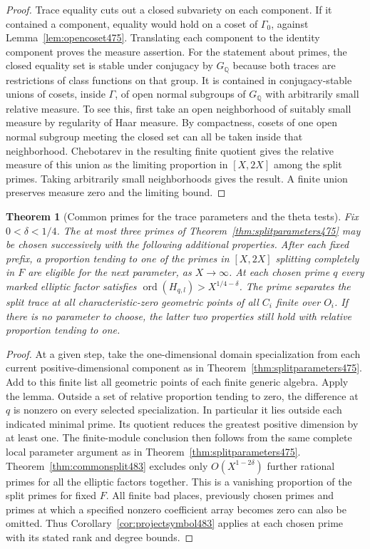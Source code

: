 \documentclass[a4paper,11pt]{article}
\newtheorem{theorem}[proposition]{Theorem}
\theoremstyle{definition}
\theoremstyle{remark}
\numberwithin{equation}{section}
\begin{document}
\begin{proof}
Trace equality cuts out a closed subvariety on each component.
If it contained a component, equality would hold on a coset
of \(\Gamma_0\), against Lemma~\ref{lem:opencoset475}. Translating
each component to the identity component proves the measure
assertion. For the statement about primes, the closed equality
set is stable under conjugacy by \(G_{\mathbb Q}\) because both
traces are restrictions of class functions on that group.
It is contained in conjugacy-stable unions of cosets, inside
\(\Gamma\), of open normal subgroups of \(G_{\mathbb Q}\) with
arbitrarily small relative measure. To see this, first take an
open neighborhood of suitably small measure by regularity of
Haar measure. By compactness, cosets of one open normal subgroup
meeting the closed set can all be taken inside that neighborhood.
Chebotarev in the resulting finite quotient gives the relative
measure of this union as the limiting proportion in \([X,2X]\)
among the split primes. Taking arbitrarily small neighborhoods
gives the result. A finite union preserves measure zero and the
limiting bound.
\end{proof}

\begin{theorem}[Common primes for the trace parameters and the theta tests]\leavevmode
\label{thm:jointprimes484}
Fix \(0<\delta<1/4\). The at most three primes of
Theorem~\ref{thm:splitparameters475} may be chosen successively
with the following additional properties. After each fixed
prefix, a proportion tending to one of the primes in
\([X,2X]\) splitting completely in \(F\) are eligible for
the next parameter, as \(X\to\infty\). At each chosen prime
\(q\) every marked elliptic factor satisfies
\(\operatorname{ord}(H_{q,l})>X^{1/4-\delta}\).
The prime separates the split trace at all characteristic-zero
geometric points of all \(C_i\) finite over \(O_i\).
If there is no parameter to choose, the latter two properties
still hold with relative proportion tending to one.
\end{theorem}
\begin{proof}
At a given step, take the one-dimensional domain specialization
from each current positive-dimensional component as in
Theorem~\ref{thm:splitparameters475}. Add to this finite list
all geometric points of each finite generic algebra. Apply the
lemma. Outside a set of relative proportion tending to zero,
the difference at \(q\) is nonzero on every selected
specialization. In particular it lies outside each indicated
minimal prime. Its quotient reduces the greatest positive
dimension by at least one. The finite-module conclusion then
follows from the same complete local parameter argument as in
Theorem~\ref{thm:splitparameters475}. Theorem~\ref{thm:commonsplit483}
excludes only \(O(X^{1-2\delta})\) further rational primes for
all the elliptic factors together. This is a vanishing proportion
of the split primes for fixed \(F\). All finite bad places,
previously chosen primes and primes at which a specified nonzero
coefficient array becomes zero can also be omitted. Thus
Corollary~\ref{cor:projectsymbol483} applies at each chosen
prime with its stated rank and degree bounds.
\end{proof}
\end{document}
